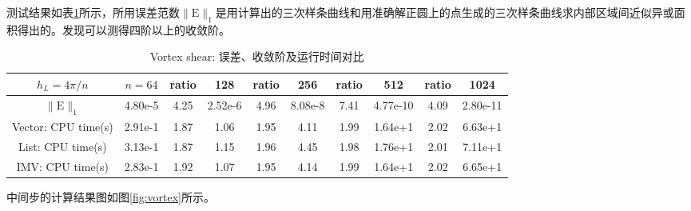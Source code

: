 \documentclass[a4paper,twoside]{ctexart}
\begin{document}
测试结果如表\ref{tab:vortex2}所示，所用误差范数$\|\mathrm{E}\|_1$是用计算出的三次样条曲线和用准确解正圆上的点生成的三次样条曲线求内部区域间近似异或面积得出的。发现可以测得四阶以上的收敛阶。

\begin{table}[htbp]
    \centering\begin{tabular}{c|ccccccccc}
        \hline
        $h_L=4\pi/n$&$n=64$&ratio&128&ratio&256&ratio&512&ratio&1024\\
        \hline
        $\|\mathrm{E}\|_1$&4.80e-5&4.25&2.52e-6&4.96&8.08e-8&7.41&4.77e-10&4.09&2.80e-11\\
        \hline
        Vector: CPU time(s)&2.91e-1&1.87&1.06&1.95&4.11&1.99&1.64e+1&2.02&6.63e+1\\
        \hline
        List: CPU time(s)&3.13e-1&1.87&1.15&1.96&4.45&1.98&1.76e+1&2.01&7.11e+1\\
        \hline
        IMV: CPU time(s)&2.83e-1&1.92&1.07&1.95&4.14&1.99&1.64e+1&2.02&6.65e+1\\
        \hline
    \end{tabular}
    \caption{Vortex shear: 误差、收敛阶及运行时间对比}
    \label{tab:vortex2}
\end{table}

中间步的计算结果图如图\ref{fig:vortex}所示。
\end{document}
